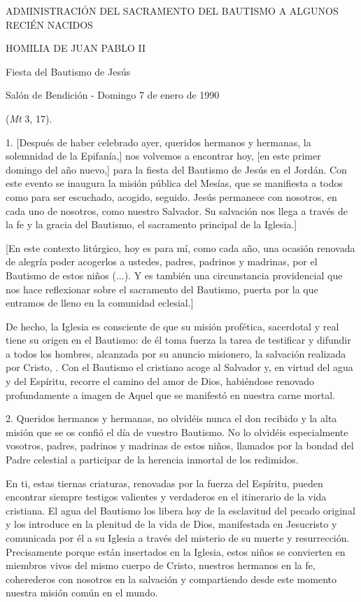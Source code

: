 \begin{body}
	ADMINISTRACIÓN DEL SACRAMENTO DEL BAUTISMO A ALGUNOS RECIÉN NACIDOS
	
	HOMILIA DE JUAN PABLO II
	
	Fiesta del Bautismo de Jesús
	
	Salón de Bendición - Domingo 7 de enero de 1990
	
	 (\emph{Mt} 3, 17).
	
	1. {[}Después de haber celebrado ayer, queridos hermanos y hermanas, la solemnidad de la Epifanía,{]} nos volvemos a encontrar hoy, {[}en este primer domingo del año nuevo,{]} para la fiesta del Bautismo de Jesús en el Jordán. Con este evento se inaugura la misión pública del Mesías, que se manifiesta a todos como  para ser escuchado, acogido, seguido. Jesús permanece con nosotros, en cada uno de nosotros, como nuestro Salvador. Su salvación nos llega a través de la fe y la gracia del Bautismo, el sacramento principal de la Iglesia.{]}
	
	{[}En este contexto litúrgico, hoy es para mí, como cada año, una ocasión renovada de alegría poder acogerlos a ustedes, padres, padrinos y madrinas, por el Bautismo de estos niños (...). Y es también una circunstancia providencial que nos hace reflexionar sobre el sacramento del Bautismo, puerta por la que entramos de lleno en la comunidad eclesial.{]}
	
	De hecho, la Iglesia es consciente de que su misión profética, sacerdotal y real tiene su origen en el Bautismo: de él toma fuerza la tarea de testificar y difundir a todos los hombres, alcanzada por su anuncio misionero, la salvación realizada por Cristo, . Con el Bautismo el cristiano acoge al Salvador y, en virtud del agua y del Espíritu, recorre el camino del amor de Dios, habiéndose renovado profundamente a imagen de Aquel que se manifestó en nuestra carne mortal.
	
	2. Queridos hermanos y hermanas, no olvidéis nunca el don recibido y la alta misión que se os confió el día de vuestro Bautismo. No lo olvidéis especialmente vosotros, padres, padrinos y madrinas de estos niños, llamados por la bondad del Padre celestial a participar de la herencia inmortal de los redimidos.
	
	En ti, estas tiernas criaturas, renovadas por la fuerza del Espíritu, pueden encontrar siempre testigos valientes y verdaderos  en el itinerario de la vida cristiana. El agua del Bautismo los libera hoy de la esclavitud del pecado original y los introduce en la plenitud de la vida de Dios, manifestada en Jesucristo y comunicada por él a su Iglesia a través del misterio de su muerte y resurrección. Precisamente porque están insertados en la Iglesia, estos niños se convierten en miembros vivos del mismo cuerpo de Cristo, nuestros hermanos en la fe, coherederos con nosotros en la salvación y compartiendo desde este momento nuestra misión común en el mundo.
	

\end{body}

